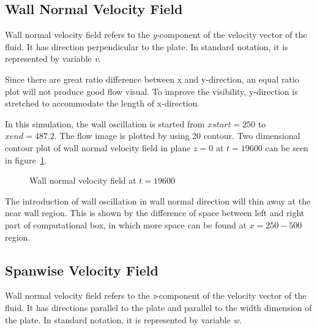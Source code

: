 \subsection{Wall Normal Velocity Field}
Wall normal velocity field refers to the \emph{y}-component of the velocity vector of the fluid. It has direction perpendicular to the plate. In standard notation, it is represented by variable \emph{v}.

Since there are great ratio difference between x and y-direction, an equal ratio plot will not produce good flow visual. To improve the visibility, y-direction is stretched to accommodate the length of x-direction.

In this simulation, the wall oscillation is started from $xstart = 250$ to $xend = 487.2$. The flow image is plotted by using 20 contour. Two dimensional contour plot of wall normal velocity field in plane $z=0$ at $t = 19600$ can be seen in figure~\ref{fig:v(x,y)}.

\begin{figure}[!h]
  \centering
  \caption{Wall normal velocity field at $t = 19600$}
  \label{fig:v(x,y)}
\end{figure}

The introduction of wall oscillation in wall normal direction will thin away at the near wall region. This is shown by the difference of space between left and right part of computational box, in which more space can be found at $x=250-500$ region.

\subsection{Spanwise Velocity Field}
Wall normal velocity field refers to the \emph{z}-component of the velocity vector of the fluid. It has directions parallel to the plate and parallel to the width dimension of the plate. In standard notation, it is represented by variable \emph{w}.

